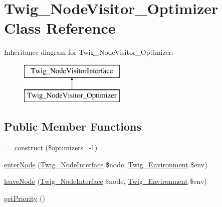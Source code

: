 \hypertarget{class_twig___node_visitor___optimizer}{}\section{Twig\+\_\+\+Node\+Visitor\+\_\+\+Optimizer Class Reference}
\label{class_twig___node_visitor___optimizer}
Inheritance diagram for Twig\+\_\+\+Node\+Visitor\+\_\+\+Optimizer\+:\begin{figure}[H]
\begin{center}
\leavevmode
\includegraphics[height=2.000000cm]{class_twig___node_visitor___optimizer}
\end{center}
\end{figure}
\subsection*{Public Member Functions}
\begin{DoxyCompactItemize}
\item 
\hyperlink{class_twig___node_visitor___optimizer_a39e1de056975cf1aea3660cbd2c0ebc9}{\+\_\+\+\_\+construct} (\$optimizers=-\/1)
\item 
\hyperlink{class_twig___node_visitor___optimizer_ad3bfee38f2bc56df9500da7f20b6e13a}{enter\+Node} (\hyperlink{interface_twig___node_interface}{Twig\+\_\+\+Node\+Interface} \$node, \hyperlink{class_twig___environment}{Twig\+\_\+\+Environment} \$env)
\item 
\hyperlink{class_twig___node_visitor___optimizer_a436bb1ae16511148e860e5cfa2cad88f}{leave\+Node} (\hyperlink{interface_twig___node_interface}{Twig\+\_\+\+Node\+Interface} \$node, \hyperlink{class_twig___environment}{Twig\+\_\+\+Environment} \$env)
\item 
\hyperlink{class_twig___node_visitor___optimizer_a1e7a3c168dcd0901a0d2669c67575b55}{get\+Priority} ()
\end{DoxyCompactItemize}

